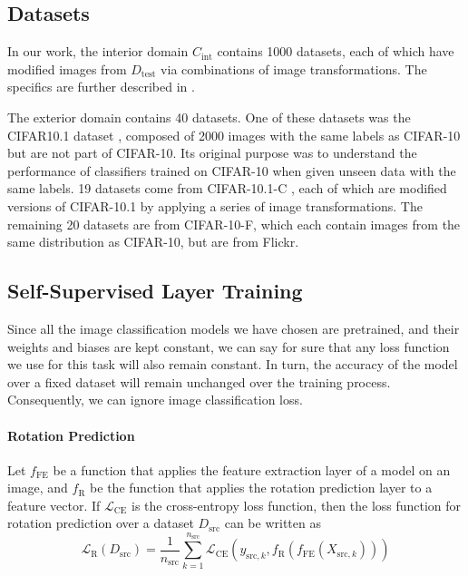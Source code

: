 \documentclass{article}
\begin{document}
\subsection{Datasets}
In our work, the interior domain $C_\text{int}$ contains 1000 datasets, each of which have modified images from $D_\text{test}$ via combinations of image transformations. The specifics are further described in \cite{deng2021labels}. 

The exterior domain contains 40 datasets. One of these datasets was the CIFAR10.1 dataset \cite{recht2018cifar10.1, torralba2008tinyimages}, composed of 2000 images with the same labels as CIFAR-10 but are not part of CIFAR-10. Its original purpose was to understand the performance of classifiers trained on CIFAR-10 when given unseen data with the same labels. 19 datasets come from CIFAR-10.1-C \cite{hendrycks2019robustness}, each of which are modified versions of CIFAR-10.1 by applying a series of image transformations. The remaining 20 datasets are from CIFAR-10-F, which each contain images from the same distribution as CIFAR-10, but are from Flickr.

\subsection{Self-Supervised Layer Training}
Since all the image classification models we have chosen are pretrained, and their weights and biases are kept constant, we can say for sure that any loss function we use for this task will also remain constant. In turn, the accuracy of the model over a fixed dataset will remain unchanged over the training process. Consequently, we can ignore image classification loss. 

\paragraph{Rotation Prediction} Let $f_\text{FE}$ be a function that applies the feature extraction layer of a model on an image, and $f_\text{R}$ be the function that applies the rotation prediction layer to a feature vector. If $\mathcal{L}_\text{CE}$ is the cross-entropy loss function, then the loss function for rotation prediction over a dataset $D_\text{src}$ can be written as
\begin{equation}
  \mathcal{L}_\text{R}(D_\text{src}) = \frac{1}{n_\text{src}}\sum_{k = 1}^{n_\text{src}} \mathcal{L}_\text{CE}(y_{\text{src}, k}, f_\text{R}(f_\text{FE}(X_{\text{src}, k})))
\end{equation}
\end{document}
